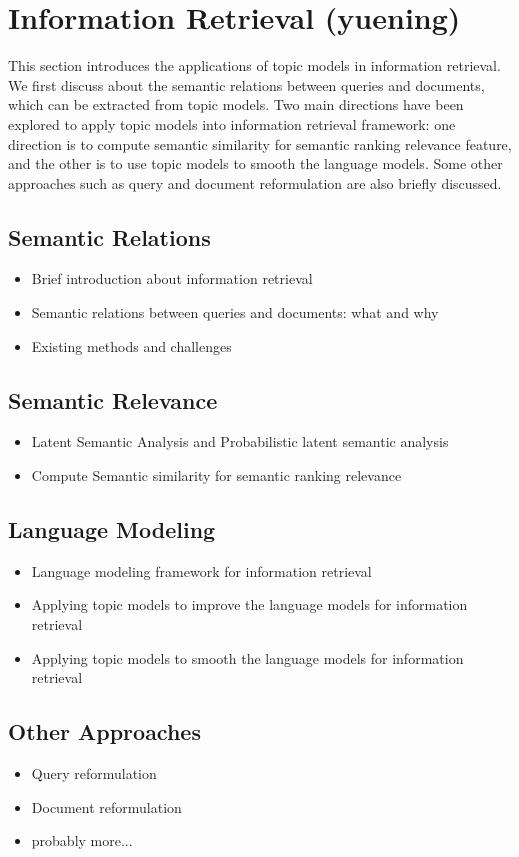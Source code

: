 \chapter{Information Retrieval (yuening)}
\label{ch:ir}

This section introduces the applications of topic models in information retrieval. We first discuss about the semantic relations between queries and documents, which can be extracted from topic models. Two main directions have been explored to apply topic models into information retrieval framework: one direction is to compute semantic similarity for semantic ranking relevance feature, and the other is to use topic models to smooth the language models. Some other approaches such as query and document reformulation are also briefly discussed.

\section{Semantic Relations}

\begin{itemize}
\item Brief introduction about information retrieval
\item Semantic relations between queries and documents: what and why
\item Existing methods and challenges
\end{itemize}

\section{Semantic Relevance}

\begin{itemize}
\item Latent Semantic Analysis and Probabilistic latent semantic analysis
\item Compute Semantic similarity for semantic ranking relevance
\end{itemize}

\section{Language Modeling}

\begin{itemize}
\item Language modeling framework for information retrieval
\item Applying topic models to improve the language models for information retrieval
\item Applying topic models to smooth the language models for information retrieval
\end{itemize}

\section{Other Approaches}

\begin{itemize}
\item Query reformulation
\item Document reformulation
\item probably more...
\end{itemize}



